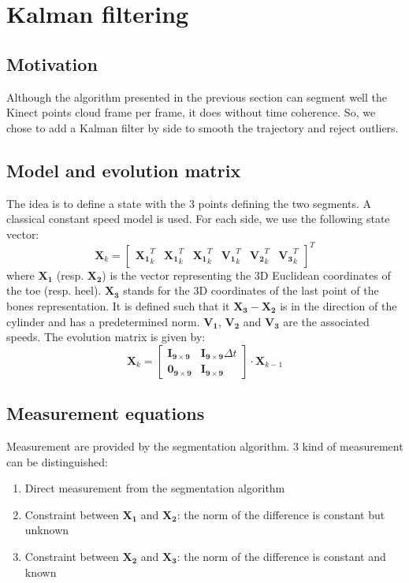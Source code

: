\documentclass[letterpaper, 10 pt, conference]{ieeeconf}
\begin{document}
\section{Kalman filtering}
\label{sec:Kalman}

\subsection{Motivation}

Although the algorithm presented in the previous section can segment well the Kinect points cloud frame per frame, it does without time coherence. So, we chose to add a Kalman filter by side to smooth the trajectory and reject outliers. 

\subsection{Model and evolution matrix}
The idea is to define a state with the 3 points defining the two segments. A classical constant speed model is used. For each side, we use the following state vector:
\begin{equation}
	\mathbf{X}_k = 
	\begin{bmatrix}
		\mathbf{X_1}^T_k & \mathbf{X_1}^T_k & \mathbf{X_1}^T_k & \mathbf{V_1}^T_k & \mathbf{V_2}^T_k & \mathbf{V_3}^T_k
	\end{bmatrix}^T
\end{equation}
where $\mathbf{X_1}$ (resp. $\mathbf{X_2}$) is the vector representing the 3D Euclidean coordinates of the toe (resp. heel). $\mathbf{X_3}$ stands for the 3D coordinates of the last point of the bones representation. It is defined such that it $\mathbf{X_3}-\mathbf{X_2}$ is in the direction of the cylinder and has a predetermined norm. $\mathbf{V_1}$, $\mathbf{V_2}$ and $\mathbf{V_3}$ are the associated speeds. The evolution matrix is given by:
\begin{equation}
	\mathbf{X}_{k} =
	\begin{bmatrix}
		\mathbf{I_{9\times 9}} & \mathbf{I_{9\times 9}}\Delta t  \\
		\mathbf{0_{9\times 9}} & \mathbf{I_{9\times 9}}
	\end{bmatrix}\cdot \mathbf{X}_{k-1}
\end{equation}

\subsection{Measurement equations}
Measurement are provided by the segmentation algorithm. 3 kind of measurement can be distinguished:
\begin{enumerate}
	\item Direct measurement from the segmentation algorithm
	\item Constraint between $\mathbf{X_1}$ and $\mathbf{X_2}$: the norm of the difference is constant but unknown
	\item Constraint between $\mathbf{X_2}$ and $\mathbf{X_3}$: the norm of the difference is constant and known
\end{enumerate}
\end{document}
